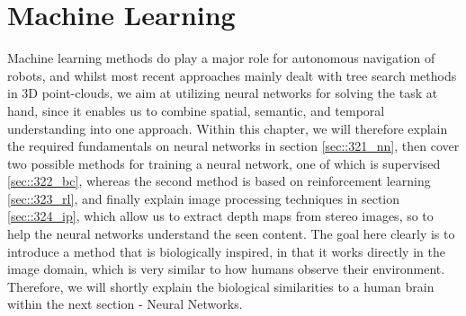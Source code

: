 \section{Machine Learning}  
\label{sec::32_ml}
Machine learning methods do play a major role for autonomous navigation of robots, and whilst most recent approaches mainly dealt with tree search methods in 3D point-clouds, we aim at utilizing neural networks for solving the task at hand, since it enables us to combine spatial, semantic, and temporal understanding into one approach. Within this chapter, we will therefore explain the required fundamentals on neural networks in section \ref{sec::321_nn}, then cover two possible methods for training a neural network, one of which is supervised \ref{sec::322_bc}, whereas the second method is based on reinforcement learning \ref{sec::323_rl}, and finally explain image processing techniques in section \ref{sec::324_ip}, which allow us to extract depth maps from stereo images, so to help the neural networks understand the seen content. The goal here clearly is to introduce a method that is biologically inspired, in that it works directly in the image domain, which is very similar to how humans observe their environment. Therefore, we will shortly explain the biological similarities to a human brain within the next section - Neural Networks.